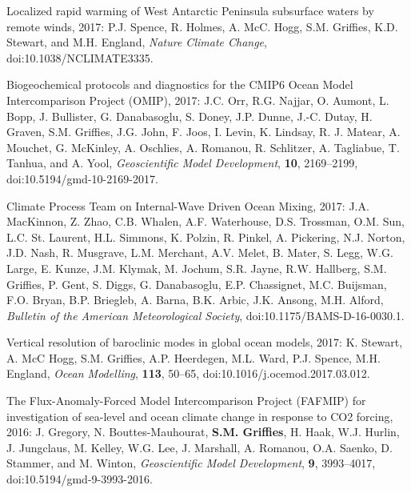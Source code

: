 \begin{etaremune}
\item Localized rapid warming of West Antarctic Peninsula subsurface waters by remote winds, 2017: P.J. Spence, R. Holmes, A. McC. Hogg,   S.M. Grif\/f\/ies, K.D. Stewart, and M.H. England, {\it Nature Climate Change}, doi:10.1038/NCLIMATE3335.

\item Biogeochemical protocols and diagnostics for the CMIP6 Ocean Model Intercomparison Project (OMIP), 2017: J.C. Orr, R.G. Najjar, O. Aumont, L.  Bopp, J. Bullister, G. Danabasoglu, S. Doney,  J.P. Dunne, J.-C. Dutay, H. Graven, S.M. Grif\/f\/ies, J.G. John, F. Joos, I. Levin, K. Lindsay, R. J. Matear, A. Mouchet, G. McKinley, A. Oschlies, A. Romanou, R. Schlitzer, A. Tagliabue, T. Tanhua, and A. Yool, {\it Geoscientific Model Development}, {\bf 10}, 2169--2199, doi:10.5194/gmd-10-2169-2017.

\item Climate Process Team on Internal-Wave Driven Ocean Mixing, 2017:  J.A. MacKinnon,
Z. Zhao, C.B. Whalen, A.F. Waterhouse, D.S. Trossman, O.M. Sun, L.C. St. Laurent, H.L. Simmons, K. Polzin, R. Pinkel, A. Pickering, 
N.J. Norton, J.D. Nash, R. Musgrave, L.M. Merchant, A.V. Melet, B. Mater, S. Legg, 
W.G. Large, E. Kunze, J.M. Klymak,  M. Jochum, S.R. Jayne, R.W. Hallberg, S.M. Grif\/f\/ies, P. Gent, S. Diggs, G. Danabasoglu, E.P. Chassignet, M.C. Buijsman, 
 F.O. Bryan, B.P. Briegleb, A. Barna, B.K. Arbic,  J.K. Ansong, M.H. Alford, {\it Bulletin of the American Meteorological Society}, doi:10.1175/BAMS-D-16-0030.1.

\item Vertical resolution of baroclinic modes in global ocean models,
  2017: K. Stewart, A. McC Hogg, S.M. Grif\/f\/ies, A.P. Heerdegen,
  M.L. Ward, P.J. Spence, M.H. England,  {\it Ocean Modelling},
  {\bf 113}, 50--65, doi:10.1016/j.ocemod.2017.03.012.

\item The Flux-Anomaly-Forced Model Intercomparison Project (FAFMIP)
  for investigation of sea-level and ocean climate change in response
  to CO2 forcing, 2016: J. Gregory, N. Bouttes-Mauhourat, {\bf
    S.M. Grif\/f\/ies}, H. Haak, W.J. Hurlin, J.  Jungclaus,
  M. Kelley, W.G. Lee, J. Marshall, A. Romanou, O.A. Saenko,
  D. Stammer, and M.  Winton, {\it Geoscientific Model Development},
  {\bf 9}, 3993--4017, doi:10.5194/gmd-9-3993-2016.







\end{etaremune}
